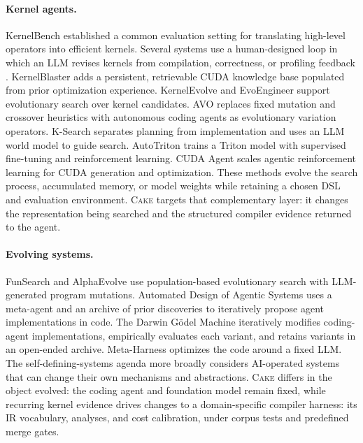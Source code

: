 \documentclass[11pt]{article}
\newcommand{\cake}{\textsc{Cake}}
\begin{document}
\paragraph{Kernel agents.}
KernelBench \cite{ouyang2024kernelbench} established a common evaluation setting
for translating high-level operators into efficient kernels. Several systems
use a human-designed loop in which an LLM revises kernels from compilation,
correctness, or profiling feedback
\cite{accelopt2025,autocomp2025,cheng2026kernelagent}. KernelBlaster
\cite{dong2026kernelblaster} adds a persistent, retrievable CUDA knowledge base
populated from prior optimization experience. KernelEvolve
\cite{liao2025kernelevolve} and EvoEngineer
\cite{guo2025evoengineermasteringautomatedcuda} support evolutionary search over
kernel candidates. AVO \cite{chen2026avo}
replaces fixed mutation and crossover heuristics with autonomous coding agents
as evolutionary variation operators. K-Search \cite{cao2026ksearch} separates
planning from implementation and uses an LLM world model to guide search.
AutoTriton \cite{li2025autotriton} trains a Triton model with supervised
fine-tuning and reinforcement learning. CUDA Agent \cite{dai2026cudaagent}
scales agentic reinforcement learning for CUDA generation and optimization.
These methods evolve the search process, accumulated memory, or model weights
while retaining a chosen DSL and evaluation environment. \cake{}
targets that complementary layer: it changes the representation being searched
and the structured compiler evidence returned to the agent.

\paragraph{Evolving systems.}
FunSearch and AlphaEvolve
\cite{romeraparedes2024funsearch,novikov2025alphaevolve} use population-based
evolutionary search with LLM-generated program mutations. Automated Design of
Agentic Systems \cite{hu2025automated} uses a meta-agent and an archive of prior
discoveries to iteratively propose agent implementations in code. The Darwin
G{\"o}del Machine \cite{zhang2026darwingodelmachineopenended} iteratively modifies coding-agent
implementations, empirically evaluates each variant, and retains variants in an
open-ended archive. Meta-Harness
\cite{lee2026metaharnessendtoendoptimizationmodel} optimizes the code around a
fixed LLM. The self-defining-systems
agenda \cite{anderson2025sds} more broadly considers AI-operated systems that can
change their own mechanisms and abstractions. \cake{} differs in the object
evolved: the coding agent and foundation model remain fixed, while recurring
kernel evidence drives changes to a domain-specific compiler harness: its IR
vocabulary, analyses, and cost calibration, under corpus tests and predefined
merge gates.
\end{document}

